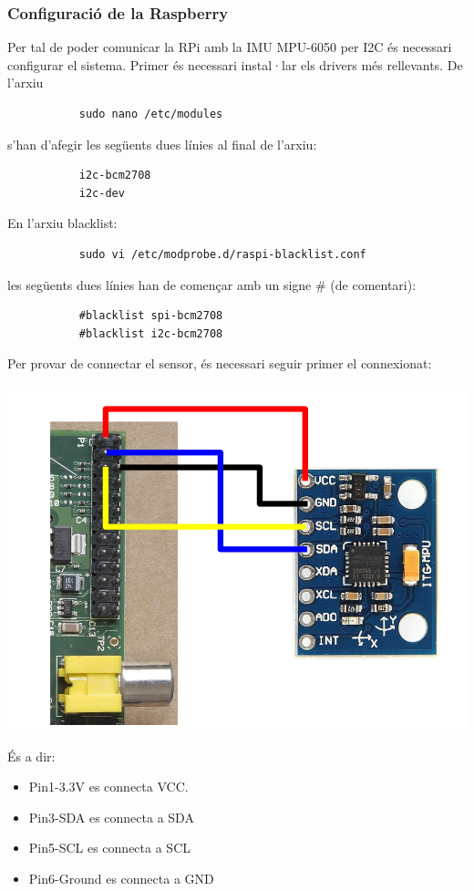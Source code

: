 \documentclass[twoside]{article}
\begin{document}
\subsubsection*{Configuració de la Raspberry}
Per tal de poder comunicar la RPi amb la IMU MPU-6050 per I2C és necessari configurar el sistema. Primer és necessari instal·lar els drivers més rellevants. De l'arxiu
\begin{verbatim}
           sudo nano /etc/modules
\end{verbatim}
s'han d'afegir les següents dues línies al final de l'arxiu:
\begin{verbatim}
           i2c-bcm2708
           i2c-dev
\end{verbatim}
En l'arxiu blacklist:
\begin{verbatim}
           sudo vi /etc/modprobe.d/raspi-blacklist.conf
\end{verbatim}
les següents dues línies han de començar amb un signe \# (de comentari):
\begin{verbatim}
           #blacklist spi-bcm2708
           #blacklist i2c-bcm2708
\end{verbatim}
Per provar de connectar el sensor, és necessari seguir primer el connexionat:
\begin{center}
\includegraphics[scale=0.2,viewport=0 200 800 720,clip]{images/ConSens.jpg}
\end{center}
És a dir:
\begin{itemize}
\item Pin1-3.3V es connecta VCC.
\item Pin3-SDA es connecta a SDA
\item Pin5-SCL es connecta a SCL
\item Pin6-Ground es connecta a GND
\end{itemize} 
\end{document}
